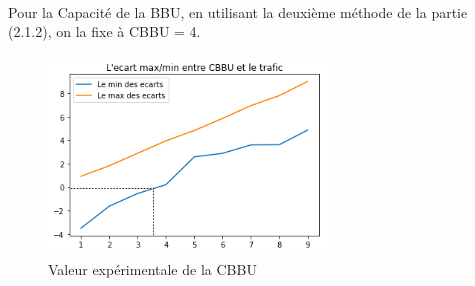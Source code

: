 \documentclass{report}
\begin{document}
\paragraph{}
Pour la Capacité de la BBU, en utilisant la deuxième méthode de la partie (2.1.2), on la fixe à CBBU = 4.
\begin{figure}[H]
  \centering
  \includegraphics[width=20em]{images/ecartCBBU0320.png}
  \caption{Valeur expérimentale de la CBBU }
\end{figure}
\end{document}
